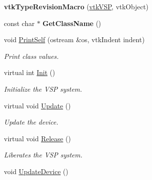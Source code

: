 \begin{DoxyCompactItemize}
\item 
\hypertarget{classvtkVSP_aec56264131580b3029ef3647730934ee}{
{\bfseries vtkTypeRevisionMacro} (\hyperlink{classvtkVSP}{vtkVSP}, vtkObject)}
\label{classvtkVSP_aec56264131580b3029ef3647730934ee}

\item 
\hypertarget{classvtkVSP_a74a399b542a119b33800a25816fb3ee5}{
const char $\ast$ {\bfseries GetClassName} ()}
\label{classvtkVSP_a74a399b542a119b33800a25816fb3ee5}

\item 
\hypertarget{classvtkVSP_aff2c09d180386b3633f19785d339bac1}{
void \hyperlink{classvtkVSP_aff2c09d180386b3633f19785d339bac1}{PrintSelf} (ostream \&os, vtkIndent indent)}
\label{classvtkVSP_aff2c09d180386b3633f19785d339bac1}

\begin{DoxyCompactList}\small\item\em Print class values. \item\end{DoxyCompactList}\item 
\hypertarget{classvtkVSP_a4b48949e4b916ebd142ef165d9e6897a}{
virtual int \hyperlink{classvtkVSP_a4b48949e4b916ebd142ef165d9e6897a}{Init} ()}
\label{classvtkVSP_a4b48949e4b916ebd142ef165d9e6897a}

\begin{DoxyCompactList}\small\item\em Initialize the VSP system. \item\end{DoxyCompactList}\item 
\hypertarget{classvtkVSP_a84afcaaf6dab2a0fe19b7021e44796e7}{
virtual void \hyperlink{classvtkVSP_a84afcaaf6dab2a0fe19b7021e44796e7}{Update} ()}
\label{classvtkVSP_a84afcaaf6dab2a0fe19b7021e44796e7}

\begin{DoxyCompactList}\small\item\em Update the device. \item\end{DoxyCompactList}\item 
\hypertarget{classvtkVSP_a91bfd5c41c807ab1dcbff59ff56a4d72}{
virtual void \hyperlink{classvtkVSP_a91bfd5c41c807ab1dcbff59ff56a4d72}{Release} ()}
\label{classvtkVSP_a91bfd5c41c807ab1dcbff59ff56a4d72}

\begin{DoxyCompactList}\small\item\em Liberates the VSP system. \item\end{DoxyCompactList}\item 
\hypertarget{classvtkVSP_a421a984e61da77184fc1e1c0eedd5956}{
void \hyperlink{classvtkVSP_a421a984e61da77184fc1e1c0eedd5956}{UpdateDevice} ()}
\label{classvtkVSP_a421a984e61da77184fc1e1c0eedd5956}


\end{DoxyCompactItemize}
